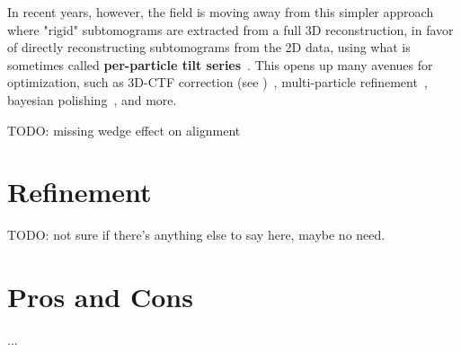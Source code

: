 In recent years, however, the field is moving away from this simpler approach where "rigid" subtomograms are extracted from a full 3D reconstruction, in favor of directly reconstructing subtomograms from the 2D data, using what is sometimes called \textbf{per-particle tilt series}~\cite{zivanovBayesianApproachSingleparticle2022,tegunovRealtimeCryoelectronMicroscopy2019,chenCompleteDataProcessing2019}.
This opens up many avenues for optimization, such as 3D-CTF correction (see )~\cite{turonovaEfficient3DCTFCorrection2017}, multi-particle refinement~\cite{tegunovMultiparticleCryoEMRefinement2021}, bayesian polishing~\cite{zivanovBayesianApproachSingleparticle2022}, and more.


TODO: missing wedge effect on alignment

\section{Refinement}\label{et_refinement}

TODO: not sure if there's anything else to say here, maybe no need.

\section{Pros and Cons}
...
